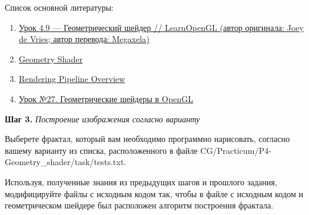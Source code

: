 \documentclass[a4paper,12pt]{article}
\begin{document}
    Список основной литературы:
    \begin{enumerate}
        \item \href{https://habr.com/ru/articles/350782/}{Урок 4.9 — Геометрический шейдер // LearnOpenGL (автор оригинала: Joey de Vries; автор перевода: Megaxela)}
        \item \href{https://www.khronos.org/opengl/wiki/Geometry_Shader}{Geometry Shader}
        \item \href{https://www.khronos.org/opengl/wiki/Rendering_Pipeline_Overview}{Rendering Pipeline Overview}
        \item \href{https://ravesli.com/urok-27-geometricheskie-shejdery-v-opengl/}{Урок №27. Геометрические шейдеры в OpenGL}
    \end{enumerate}
   
    \textbf{Шаг 3.} \textit{Построение изображения согласно варианту}
    
    Выберете фрактал, который вам необходимо программно нарисовать, согласно вашему варианту из списка, расположенного в файле \textquotedbl CG/Practicum/P4-Geometry\_shader/task/tests.txt\textquotedbl.

    Используя, полученные знания из предыдущих шагов и прошлого задания, модифицируйте файлы с исходным кодом так, чтобы в файле с исходным кодом и геометрическом шейдере был расположен алгоритм построения фрактала.
    
\end{document}
